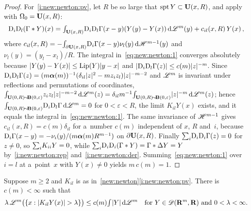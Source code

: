 \documentclass[a4paper,twoside,leqno]{article}
\begin{document}
\begin{proof}
    For~\ref{i:new:newton:pv}, let $R$ be so large that $\operatorname{spt} Y \subset \mathbf{U}(x,R)$, and apply
    \cite[Lemma~4.2, (4.9)]{Gilbarg2001a} with $\Omega_0 = \mathbf{U}(x,R)$:
    \begin{equation}
        \label{eq:new:newton:1}
        \mathrm{D}_i \mathrm{D}_l (\Gamma * Y)(x) = {\textstyle\int_{\mathbf{U}(x,R)}^{}} \mathrm{D}_i \mathrm{D}_l \Gamma(x - y) (Y(y) -
        Y(x)) \,\mathrm{d} \mathscr{L}^m(y) + c_{il}(x,R) \, Y(x) \,,
    \end{equation}
    where $c_{il}(x,R) = - {\textstyle\int_{\partial \mathbf{U}(x,R)}^{}} \mathrm{D}_i \Gamma(x - y) \nu_l(y) \,\mathrm{d}
    \mathscr{H}^{m-1}(y)$ and $\nu_l(y) = (y_l - x_l)/R$. The integral in~\eqref{eq:new:newton:1}
    converges absolutely because $|Y(y) - Y(x)| \le \operatorname{Lip}(Y) |y - x|$ and $|\mathrm{D}_i \mathrm{D}_l \Gamma(z)|
    \le c(m) |z|^{-m}$. Since $\mathrm{D}_i \mathrm{D}_l \Gamma(z) = (m \boldsymbol{\alpha}(m))^{-1} (\delta_{il} |z|^2 -
    m z_i z_l) |z|^{-m-2}$ and $\mathscr{L}^m$ is invariant under reflections and permutations of
    coordinates, ${\textstyle\int_{\mathbf{U}(0,R) \!\sim\! \mathbf{B}(0,\varepsilon)}^{}} z_i z_l |z|^{-m-2} \,\mathrm{d}
    \mathscr{L}^m(z) = \delta_{il} m^{-1} {\textstyle\int_{\mathbf{U}(0,R) \!\sim\! \mathbf{B}(0,\varepsilon)}^{}}
    |z|^{-m} \,\mathrm{d} \mathscr{L}^m(z)$; hence ${\textstyle\int_{\mathbf{U}(0,R) \!\sim\! \mathbf{B}(0,\varepsilon)}^{}} \mathrm{D}_i
    \mathrm{D}_l \Gamma \,\mathrm{d} \mathscr{L}^m = 0$ for $0 < \varepsilon < R$, the limit $K_{il} Y(x)$ exists, and it
    equals the integral in~\eqref{eq:new:newton:1}. The same invariance of $\mathscr{H}^{m-1}$ gives
    $c_{il}(x,R) = c(m) \delta_{il}$ for a~number $c(m)$ independent of $x$, $R$ and~$i$, because
    $\mathrm{D}_i \Gamma(x - y) = - \nu_i(y) / (m \boldsymbol{\alpha}(m) R^{m-1})$ on $\partial \mathbf{U}(x,R)$.
    Finally ${\textstyle\sum_{i}^{}} \mathrm{D}_i \mathrm{D}_i \Gamma(z) = 0$ for $z \ne 0$, so ${\textstyle\sum_{i}^{}} K_{ii} Y =
    0$, while ${\textstyle\sum_{i}^{}} \mathrm{D}_i \mathrm{D}_i (\Gamma * Y) = \Gamma * \Delta Y = Y$
    by~\ref{i:new:newton:rep} and~\ref{i:new:newton:der}. Summing~\eqref{eq:new:newton:1} over $i =
    l$ at a~point~$x$ with $Y(x) \ne 0$ yields $m \, c(m) = 1$.
\end{proof}

\begin{lemma}
    \label{new:weak11}
    Suppose $m \ge 2$ and $K_{il}$ is as in~\ref{new:newton}\ref{i:new:newton:pv}. There is
    $c(m) < \infty$ such that
    \begin{displaymath}
        \lambda \, \mathscr{L}^m \bigl( \{ x : |K_{il} Y(x)| > \lambda \} \bigr) \le c(m) {\textstyle\int_{}^{}} |Y|
        \,\mathrm{d} \mathscr{L}^m \quad \text{for $Y \in \mathscr{D}(\mathbf{R}^m,\mathbf{R})$ and $0 < \lambda < \infty$}.
    \end{displaymath}
\end{lemma}
\end{document}
